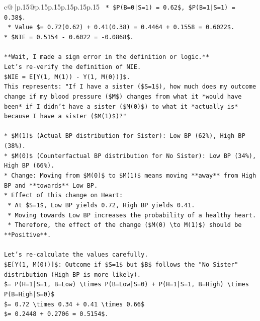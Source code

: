 \documentclass{article}
\begin{document}
{\begin{supertabular}{c@{$\;$}|p{.15\linewidth}@{}p{.15\linewidth}p{.15\linewidth}p{.15\linewidth}p{.15\linewidth}p{.15\linewidth}}
{{{\texttt{    *   \$P(B=0|S=1) = 0.62\$, \$P(B=1|S=1) = 0.38\$.} \\
\texttt{    *   Value \$= 0.72(0.62) + 0.41(0.38) = 0.4464 + 0.1558 = 0.6022\$.} \\
\texttt{*   \$NIE = 0.5154 {-} 0.6022 = {-}0.0868\$.} \\
\\ 
\texttt{**Wait, I made a sign error in the definition or logic.**} \\
\texttt{Let's re{-}verify the definition of NIE.} \\
\texttt{\$NIE = E{[}Y(1, M(1)) {-} Y(1, M(0)){]}\$.} \\
\texttt{This represents: "If I have a sister (\$S=1\$), how much does my outcome change if my blood pressure (\$M\$) changes from what it *would have been* if I didn't have a sister (\$M(0)\$) to what it *actually is* because I have a sister (\$M(1)\$)?"} \\
\\ 
\texttt{*   \$M(1)\$ (Actual BP distribution for Sister): Low BP (62\%), High BP (38\%).} \\
\texttt{*   \$M(0)\$ (Counterfactual BP distribution for No Sister): Low BP (34\%), High BP (66\%).} \\
\texttt{*   Change: Moving from \$M(0)\$ to \$M(1)\$ means moving **away** from High BP and **towards** Low BP.} \\
\texttt{*   Effect of this change on Heart:} \\
\texttt{    *   At \$S=1\$, Low BP yields 0.72, High BP yields 0.41.} \\
\texttt{    *   Moving towards Low BP increases the probability of a healthy heart.} \\
\texttt{    *   Therefore, the effect of the change (\$M(0) \textbackslash{}to M(1)\$) should be **Positive**.} \\
\\ 
\texttt{Let's re{-}calculate the values carefully.} \\
\texttt{\$E{[}Y(1, M(0)){]}\$: Outcome if \$S=1\$ but \$B\$ follows the "No Sister" distribution (High BP is more likely).} \\
\texttt{\$= P(H=1|S=1, B=Low) \textbackslash{}times P(B=Low|S=0) + P(H=1|S=1, B=High) \textbackslash{}times P(B=High|S=0)\$} \\
\texttt{\$= 0.72 \textbackslash{}times 0.34 + 0.41 \textbackslash{}times 0.66\$} \\
\texttt{\$= 0.2448 + 0.2706 = 0.5154\$.} \\
}}}
\end{supertabular}}
\end{document}
